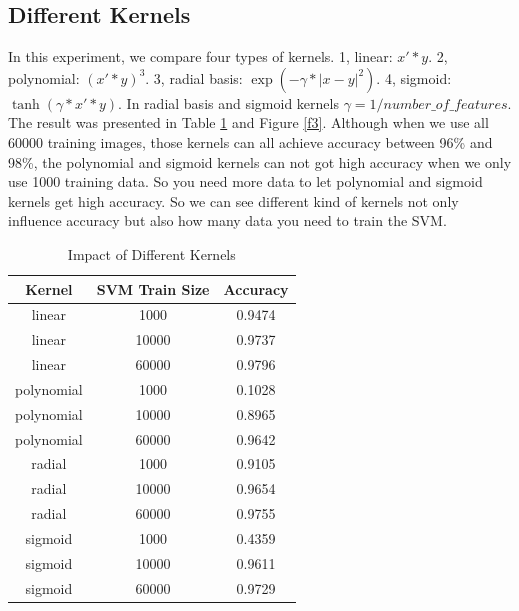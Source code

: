 \documentclass[10pt,twocolumn,letterpaper]{article}
\begin{document}
\subsection{Different Kernels}
In this experiment, we compare four types of kernels. 1, linear: $x' * y$. 2, polynomial: $ ( x' * y ) ^ 3 $. 3, radial basis: $\exp(-\gamma * |x-y| ^2)$. 4, sigmoid: $\tanh(\gamma * x' * y)$. In radial basis and sigmoid kernels $\gamma = 1/number\_of\_features$. The result was presented in Table \ref{t4} and Figure \ref{f3}. Although when we use all 60000 training images, those kernels can all achieve accuracy between 96\% and 98\%, the polynomial and sigmoid kernels can not got high accuracy when we only use 1000 training data. So you need more data to let polynomial and sigmoid kernels get high accuracy. So we can see different kind of kernels not only influence accuracy but also how many data you need to train the SVM.


\begin{table}
    \begin{center}
    \begin{tabular}{|c|c|c|}
      \hline
      Kernel & SVM Train Size & Accuracy \\
      \hline
      linear & 1000 & 0.9474 \\
      linear & 10000 & 0.9737 \\
      linear & 60000 & 0.9796 \\
      \hline
      polynomial & 1000 & 0.1028 \\
      polynomial & 10000 & 0.8965 \\
      polynomial & 60000 & 0.9642\\
      \hline
      radial & 1000 & 0.9105 \\
      radial & 10000 & 0.9654 \\
      radial & 60000 & 0.9755 \\
      \hline
      sigmoid & 1000 & 0.4359 \\
      sigmoid & 10000 & 0.9611 \\
      sigmoid & 60000 & 0.9729 \\
      \hline
    \end{tabular}
    \end{center}

    \caption{Impact of Different Kernels}
    \label{t4}
\end{table}
\end{document}
